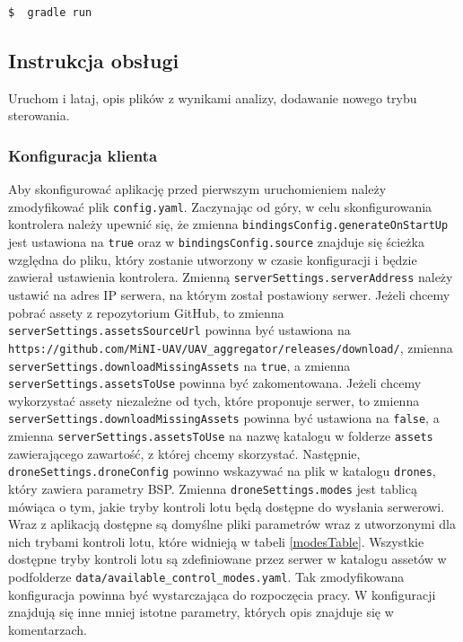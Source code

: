 \documentclass[15pt]{sprawozdanie}
\begin{document}
\begin{lstlisting}[language=bash]
  $  gradle run 
\end{lstlisting}  


\subsection{Instrukcja obsługi} \label{manual}
Uruchom i lataj, opis plików z wynikami analizy, dodawanie nowego trybu sterowania.
\subsubsection{Konfiguracja klienta}
\label{fastClient}

Aby skonfigurować aplikację przed pierwszym uruchomieniem należy zmodyfikować plik \texttt{config.yaml}. Zaczynając od góry, w celu skonfigurowania kontrolera należy upewnić się, że zmienna \texttt{bindingsConfig.generateOnStartUp} jest ustawiona na \texttt{true} oraz w \texttt{bindingsConfig.source} znajduje się ścieżka względna do pliku, który zostanie utworzony w czasie konfiguracji i będzie zawierał ustawienia kontrolera. Zmienną \texttt{serverSettings.serverAddress} należy ustawić na adres IP serwera, na którym został postawiony serwer. Jeżeli chcemy pobrać assety z repozytorium GitHub, to zmienna \\ \texttt{serverSettings.assetsSourceUrl} powinna być ustawiona na \\ \texttt{https://github.com/MiNI-UAV/UAV\_aggregator/releases/download/}, zmienna \\ \texttt{serverSettings.downloadMissingAssets} na \texttt{true}, a zmienna \texttt{serverSettings.assetsToUse} powinna być zakomentowana. Jeżeli chcemy wykorzystać assety niezależne od tych, które proponuje serwer, to zmienna \texttt{serverSettings.downloadMissingAssets} powinna być ustawiona na  \texttt{false}, a zmienna \texttt{serverSettings.assetsToUse} na nazwę katalogu w folderze \texttt{assets} zawierającego zawartość, z której chcemy skorzystać. Następnie, \texttt{droneSettings.droneConfig} powinno wskazywać na plik w katalogu \texttt{drones}, który zawiera parametry BSP. Zmienna \texttt{droneSettings.modes} jest tablicą mówiąca o tym, jakie tryby kontroli lotu będą dostępne do wysłania serwerowi. Wraz z aplikacją dostępne są domyślne pliki parametrów wraz z utworzonymi dla nich trybami kontroli lotu, które widnieją w tabeli \ref{modesTable}. Wszystkie dostępne tryby kontroli lotu są zdefiniowane przez serwer w katalogu assetów w podfolderze \texttt{data/available\_control\_modes.yaml}. Tak zmodyfikowana konfiguracja powinna być wystarczająca do rozpoczęcia pracy. W konfiguracji znajdują się inne mniej istotne parametry, których opis znajduje się w komentarzach.
\end{document}
